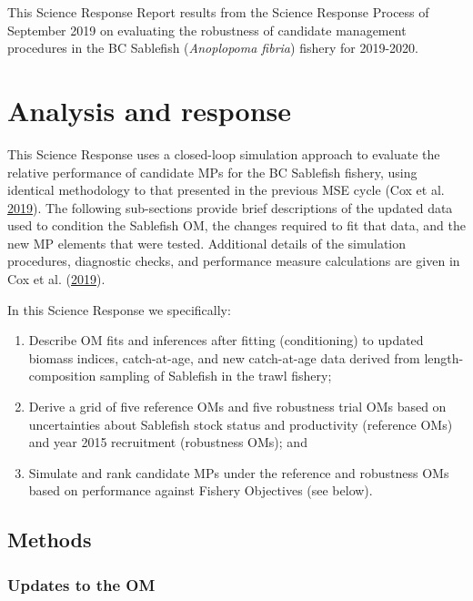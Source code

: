 \documentclass[11pt]{book}
\begin{document}
This Science Response Report results from the Science Response Process of September 2019 on evaluating the robustness of candidate management procedures in the BC Sablefish (\emph{Anoplopoma fibria}) fishery for 2019-2020.

\hypertarget{analysis-and-response}{%
\section{Analysis and response}\label{analysis-and-response}}

This Science Response uses a closed-loop simulation approach to evaluate the relative performance of candidate MPs for the BC Sablefish fishery, using identical methodology to that presented in the previous MSE cycle (Cox et al. \protect\hyperlink{ref-cox2019evaluating}{2019}). The following sub-sections provide brief descriptions of the updated data used to condition the Sablefish OM, the changes required to fit that data, and the new MP elements that were tested. Additional details of the simulation procedures, diagnostic checks, and performance measure calculations are given in Cox et al. (\protect\hyperlink{ref-cox2019evaluating}{2019}).

In this Science Response we specifically:
\begin{enumerate}
\def\labelenumi{\arabic{enumi}.}

\item
  Describe OM fits and inferences after fitting (conditioning) to updated biomass indices, catch-at-age, and new catch-at-age data derived from length-composition sampling of Sablefish in the trawl fishery;
\item
  Derive a grid of five reference OMs and five robustness trial OMs based on uncertainties about Sablefish stock status and productivity (reference OMs) and year 2015 recruitment (robustness OMs); and
\item
  Simulate and rank candidate MPs under the reference and robustness OMs based on performance against Fishery Objectives (see below).
\end{enumerate}
\hypertarget{methods}{%
\subsection{Methods}\label{methods}}

\hypertarget{updates-to-the-om}{%
\subsubsection{Updates to the OM}\label{updates-to-the-om}}
\end{document}
